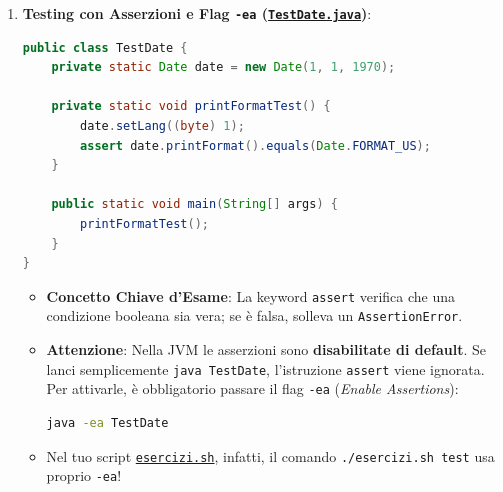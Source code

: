 \documentclass[11pt,a4paper,oneside]{report}
\newcommand{\passthrough}[1]{#1}
\begin{document}
\begin{enumerate}
  \begin{itemize}
  \item
    Nei getter di \passthrough{\lstinline!Date.java!} (righe 38--39 del
    codice ufficiale), il prof ha inavvertitamente scritto:

\begin{lstlisting}[language=Java]
public int getMonth() { return day; }
public int getYear() { return day; }
\end{lstlisting}

    Sia \passthrough{\lstinline!getMonth()!} che
    \passthrough{\lstinline!getYear()!} restituiscono il campo
    \passthrough{\lstinline!day!} anziché
    \passthrough{\lstinline!month!} e \passthrough{\lstinline!year!}!
    Nel tuo codice assicurati di restituire i campi corretti
    (\passthrough{\lstinline!return month;!} e
    \passthrough{\lstinline!return year;!}).
  \end{itemize}
\item
  \textbf{Testing con Asserzioni e Flag \passthrough{\lstinline!-ea!}
  (\href{file:///home/wally/Documenti/GitHub/Programmazione-II/25-26/Teoria-e-Esercitazioni/Codice-20260902/Lezione07/SimpleDate/src/TestDate.java}{\passthrough{\lstinline!TestDate.java!}})}:

\begin{lstlisting}[language=Java]
public class TestDate {
    private static Date date = new Date(1, 1, 1970);

    private static void printFormatTest() {
        date.setLang((byte) 1);
        assert date.printFormat().equals(Date.FORMAT_US);
    }

    public static void main(String[] args) {
        printFormatTest();
    }
}
\end{lstlisting}

  \begin{itemize}
  \item
    \textbf{Concetto Chiave d'Esame}: La keyword
    \passthrough{\lstinline!assert!} verifica che una condizione
    booleana sia vera; se è falsa, solleva un
    \passthrough{\lstinline!AssertionError!}.
  \item
    \textbf{Attenzione}: Nella JVM le asserzioni sono
    \textbf{disabilitate di default}. Se lanci semplicemente
    \passthrough{\lstinline!java TestDate!}, l'istruzione
    \passthrough{\lstinline!assert!} viene ignorata. Per attivarle, è
    obbligatorio passare il flag \passthrough{\lstinline!-ea!}
    (\emph{Enable Assertions}):

\begin{lstlisting}[language=bash]
java -ea TestDate
\end{lstlisting}
  \item
    Nel tuo script
    \href{file:///home/wally/Documenti/GitHub/Programmazione-II/25-26/esercizi-wally-25-26/esercizi.sh}{\passthrough{\lstinline!esercizi.sh!}},
    infatti, il comando \passthrough{\lstinline!./esercizi.sh test!} usa
    proprio \passthrough{\lstinline!-ea!}!
  \end{itemize}
\end{enumerate}
\end{document}
